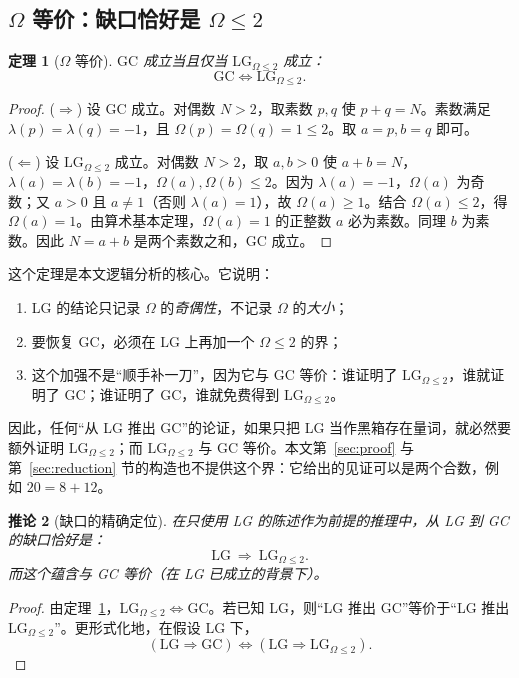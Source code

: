 \documentclass[11pt,a4paper]{ctexart}
\theoremstyle{plain}
\newtheorem{theorem}{定理}[section]
\newtheorem{corollary}[theorem]{推论}
\theoremstyle{definition}
\newcommand{\li}{\lambda}
\newcommand{\Om}{\Omega}
\newcommand{\GC}{\mathrm{GC}}
\newcommand{\LG}{\mathrm{LG}}
\newcommand{\LGtwo}{\mathrm{LG}_{\Om\le2}}
\begin{document}
\subsection{$\Om$ 等价：缺口恰好是 $\Om\le2$}
\label{sec:omega-equiv}

\begin{theorem}[$\Om$ 等价]
\label{thm:omega-equiv}
$\GC$ 成立当且仅当 $\LGtwo$ 成立：
\[
  \GC\iff\LGtwo.
\]
\end{theorem}

\begin{proof}
($\Rightarrow$) 设 $\GC$ 成立。对偶数 $N>2$，取素数 $p,q$ 使 $p+q=N$。素数满足 $\li(p)=\li(q)=-1$，且 $\Om(p)=\Om(q)=1\le2$。取 $a=p,b=q$ 即可。

($\Leftarrow$) 设 $\LGtwo$ 成立。对偶数 $N>2$，取 $a,b>0$ 使 $a+b=N$，$\li(a)=\li(b)=-1$，$\Om(a),\Om(b)\le2$。因为 $\li(a)=-1$，$\Om(a)$ 为奇数；又 $a>0$ 且 $a\ne1$（否则 $\li(a)=1$），故 $\Om(a)\ge1$。结合 $\Om(a)\le2$，得 $\Om(a)=1$。由算术基本定理，$\Om(a)=1$ 的正整数 $a$ 必为素数。同理 $b$ 为素数。因此 $N=a+b$ 是两个素数之和，$\GC$ 成立。
\end{proof}

这个定理是本文逻辑分析的核心。它说明：
\begin{enumerate}
\item LG 的结论只记录 $\Om$ 的\emph{奇偶性}，不记录 $\Om$ 的\emph{大小}；
\item 要恢复 GC，必须在 LG 上再加一个 $\Om\le2$ 的界；
\item 这个加强不是“顺手补一刀”，因为它与 GC 等价：谁证明了 $\LGtwo$，谁就证明了 GC；谁证明了 $\GC$，谁就免费得到 $\LGtwo$。
\end{enumerate}

因此，任何“从 LG 推出 GC”的论证，如果只把 LG 当作黑箱存在量词，就必然要额外证明 $\LGtwo$；而 $\LGtwo$ 与 GC 等价。本文第~\ref{sec:proof} 与第~\ref{sec:reduction} 节的构造也不提供这个界：它给出的见证可以是两个合数，例如 $20=8+12$。

\begin{corollary}[缺口的精确定位]
\label{cor:gap}
在只使用 LG 的陈述作为前提的推理中，从 LG 到 GC 的缺口恰好是：
\[
  \LG\ \Longrightarrow\ \LGtwo.
\]
而这个蕴含与 GC 等价（在 LG 已成立的背景下）。
\end{corollary}

\begin{proof}
由定理~\ref{thm:omega-equiv}，$\LGtwo\iff\GC$。若已知 LG，则“LG 推出 GC”等价于“LG 推出 $\LGtwo$”。更形式化地，在假设 LG 下，
\[
  (\LG\Rightarrow\GC)\iff(\LG\Rightarrow\LGtwo).
\]
\end{proof}
\end{document}
